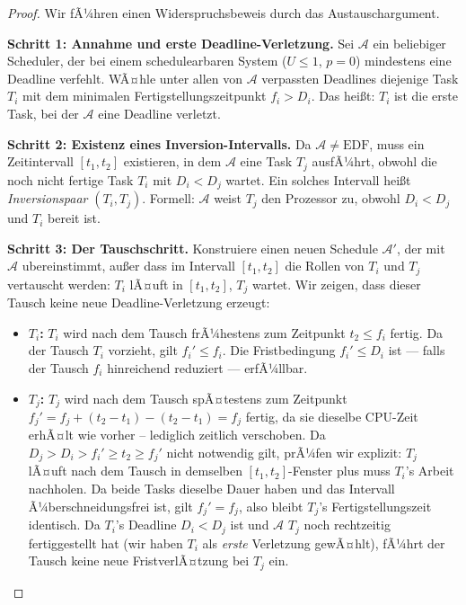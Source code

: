 ﻿\documentclass[a4paper,12pt]{article}
\theoremstyle{definition}
\begin{document}
	\begin{proof}
		Wir fÃ¼hren einen Widerspruchsbeweis durch das Austauschargument.

		\medskip
		\textbf{Schritt 1: Annahme und erste Deadline-Verletzung.}
		Sei $\mathcal{A}$ ein beliebiger Scheduler, der bei einem schedulearbaren
		System ($U \le 1$, $p=0$) mindestens eine Deadline verfehlt. WÃ¤hle unter
		allen von $\mathcal{A}$ verpassten Deadlines diejenige Task $T_i$ mit dem
		minimalen Fertigstellungszeitpunkt $f_i > D_i$. Das hei\ss{}t: $T_i$ ist
		die erste Task, bei der $\mathcal{A}$ eine Deadline verletzt.

		\medskip
		\textbf{Schritt 2: Existenz eines Inversion-Intervalls.}
		Da $\mathcal{A} \neq \text{EDF}$, muss ein Zeitintervall $[t_1, t_2]$
		existieren, in dem $\mathcal{A}$ eine Task $T_j$ ausfÃ¼hrt, obwohl
		die noch nicht fertige Task $T_i$ mit $D_i < D_j$ wartet. Ein solches
		Intervall hei\ss{}t \emph{Inversionspaar} $(T_i, T_j)$.
		Formell: $\mathcal{A}$ weist $T_j$ den Prozessor zu, obwohl
		$D_i < D_j$ und $T_i$ bereit ist.

		\medskip
		\textbf{Schritt 3: Der Tauschschritt.}
		Konstruiere einen neuen Schedule $\mathcal{A}'$, der mit $\mathcal{A}$
		ubereinstimmt, au\ss{}er dass im Intervall $[t_1, t_2]$ die Rollen von
		$T_i$ und $T_j$ vertauscht werden: $T_i$ lÃ¤uft in $[t_1, t_2]$,
		$T_j$ wartet. Wir zeigen, dass dieser Tausch keine neue Deadline-Verletzung
		erzeugt:
		\begin{itemize}
			\item \textbf{$T_i$:} $T_i$ wird nach dem Tausch frÃ¼hestens zum
			      Zeitpunkt $t_2 \le f_i$ fertig. Da der Tausch $T_i$ vorzieht,
			      gilt $f_i' \le f_i$. Die Fristbedingung $f_i' \le D_i$ ist
			      --- falls der Tausch $f_i$ hinreichend reduziert --- erfÃ¼llbar.
			\item \textbf{$T_j$:} $T_j$ wird nach dem Tausch spÃ¤testens zum
			      Zeitpunkt $f_j' = f_j + (t_2 - t_1) - (t_2 - t_1) = f_j$
			      fertig, da sie dieselbe CPU-Zeit erhÃ¤lt wie vorher -- lediglich
			      zeitlich verschoben. Da $D_j > D_i > f_i' \ge t_2 \ge f_j'$
			      nicht notwendig gilt, prÃ¼fen wir explizit: $T_j$ lÃ¤uft nach
			      dem Tausch in demselben $[t_1, t_2]$-Fenster plus muss
			      $T_i$'s Arbeit nachholen. Da beide Tasks dieselbe Dauer haben
			      und das Intervall Ã¼berschneidungsfrei ist, gilt
			      $f_j' = f_j$, also bleibt $T_j$'s Fertigstellungszeit
			      identisch. Da $T_i$'s Deadline $D_i < D_j$ ist und
			      $\mathcal{A}$ $T_j$ noch rechtzeitig fertiggestellt hat
			      (wir haben $T_i$ als \emph{erste} Verletzung gewÃ¤hlt),
			      fÃ¼hrt der Tausch keine neue FristverlÃ¤tzung bei $T_j$ ein.
		\end{itemize}


\end{proof}
\end{document}
